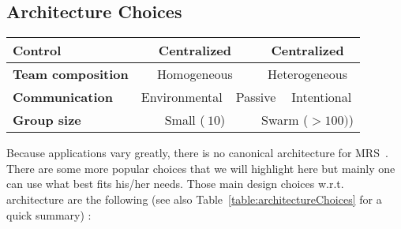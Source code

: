   \subsection{Architecture Choices}

    \begin{table*}[ht]
      \centerfloat
        \begin{tabular}{|l|c|c|c|c|c|c|}
          \hline
          \textbf{Control} & \multicolumn{3}{|c|}{Centralized} & \multicolumn{3}{|c|}{Centralized} \\
          \hline
          \textbf{Team composition} & \multicolumn{3}{|c|}{Homogeneous} & \multicolumn{3}{|c|}{Heterogeneous} \\
          \hline
          \textbf{Communication} & \multicolumn{2}{|c|}{Environmental} & \multicolumn{2}{|c|}{Passive} & \multicolumn{2}{|c|}{Intentional} \\
          \hline
          \textbf{Group size} & \multicolumn{3}{|c|}{Small (\(~ 10\))} & \multicolumn{3}{|c|}{Swarm (\(> 100)\))} \\
          \hline
        \end{tabular}
        \caption{\textbf{Architecture choices in multirobot systems.}}
      \label{table:architectureChoices}
    \end{table*}

    Because applications vary greatly, there is no canonical architecture for MRS~\parencite{Cao1997, Parker2008}. There are some more popular choices that we will highlight here but mainly one can use what best fits his/her needs. Those main design choices w.r.t. architecture are the following (see also Table~\ref{table:architectureChoices} for a quick summary) :

